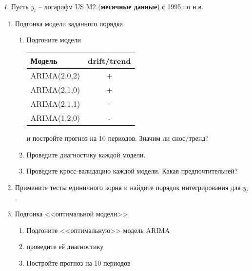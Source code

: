 \documentclass[12pt]{article}
\theoremstyle{remark}
\newtheorem{exercise}{}[subsection]
\begin{document}

\begin{exercise}
Пусть \(y_t\) -- логарифм US M2 (\textbf{месячные данные}) с 1995 по н.в.
\begin{enumerate}
	\item Подгонка модели заданного порядка
	\begin{enumerate}
		\item Подгоните модели
		\begin{center}
		\begin{tabular}{l|c}
			Модель & drift/trend \\ \hline
			ARIMA(2,0,2) & + \\
			ARIMA(2,1,0) & + \\
			ARIMA(2,1,1) & - \\
			ARIMA(1,2,0) & - \\ \hline
		\end{tabular}
		\end{center} 
		и постройте прогноз на 10 периодов. Значим ли снос/тренд?
		\item Проведите диагностику каждой модели.
		\item Проведите кросс-валидацию каждой модели. Какая предпочтительней?
	\end{enumerate}
	\item Примените тесты единичного корня и найдите порядок интегрирования для \(y_t\). 
	\item Подгонка <<оптимальной модели>>
	\begin{enumerate}
		\item Подгоните <<оптимальную>> модель ARIMA
		\item проведите её диагностику
		\item Постройте прогноз на 10 периодов
	\end{enumerate}
\end{enumerate}
\end{exercise}
\end{document}
